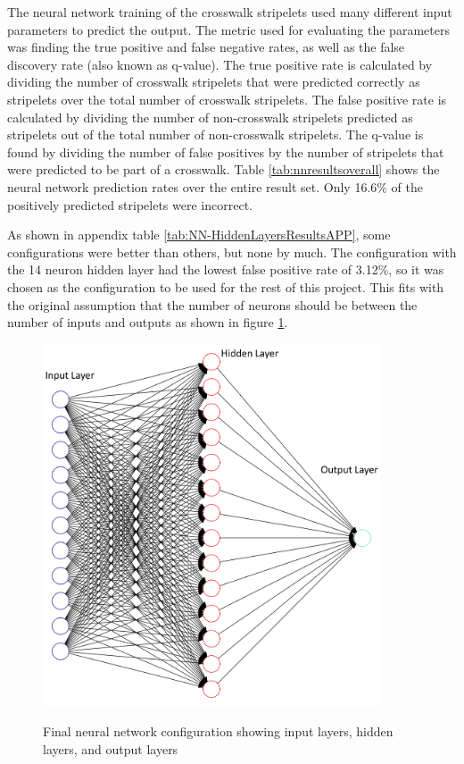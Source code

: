 \documentclass[12pt]{ucthesis}
\newcommand{\captionfonts}{\small\bf\ssp}
\begin{document}
The neural network training of the crosswalk stripelets used many different input parameters to predict the output. The metric used for evaluating the parameters was finding the true positive and false negative rates, as well as the false discovery rate (also known as q-value). The true positive rate is calculated by dividing the number of crosswalk stripelets that were predicted correctly as stripelets over the total number of crosswalk stripelets. The false positive rate is calculated by dividing the number of non-crosswalk stripelets predicted as stripelets out of the total number of non-crosswalk stripelets. The q-value is found by dividing the number of false positives by the number of stripelets that were predicted to be part of a crosswalk. Table \ref{tab:nnresultsoverall} shows the neural network prediction rates over the entire result set. Only 16.6\% of the positively predicted stripelets were incorrect. 


As shown in appendix table \ref{tab:NN-HiddenLayersResultsAPP}, some configurations were better than others, but none by much. The configuration with the 14 neuron hidden layer had the lowest false positive rate of 3.12\%, so it was chosen as the configuration to be used for the rest of this project. This fits with the original assumption that the number of neurons should be between the number of inputs and outputs as shown in figure \ref{fig:Neural1png}. 

\begin{figure}[t]
\begin{center}
\includegraphics[width=10cm]{ChosenNN3Small.png}
\captionfonts
\caption[Final Neural Network Configuration]{Final neural network configuration showing input layers, hidden layers, and output layers}
\label{fig:Neural1png}
\end{center}
\end{figure}
\end{document}
